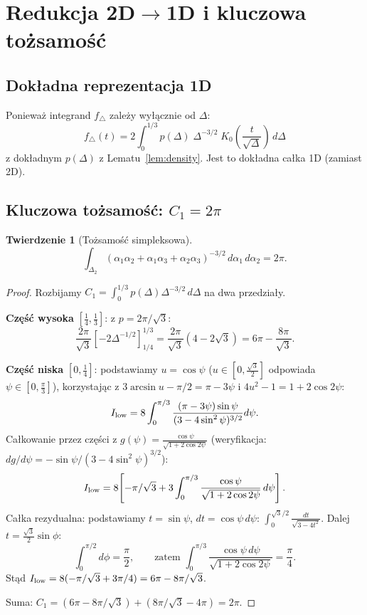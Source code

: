 \documentclass[11pt,a4paper]{article}
\newcommand{\Dt}{\Delta}
\newtheorem{theorem}{Twierdzenie}
\begin{document}
\section{Redukcja 2D$\to$1D i kluczowa to\.{z}samo\'s\'c}
\label{sec:1D}

\subsection{Dok\l{}adna reprezentacja 1D}

Poniewa\.{z} integrand $f_\triangle$ zale\.{z}y wy\l{}\k{a}cznie od $\Dt$:
\begin{equation}
\label{eq:f_triangle_1D}
\boxed{
f_\triangle(t)
= 2\int_0^{1/3} p(\Dt)\;\Dt^{-3/2}\;K_0\!\left(\frac{t}{\sqrt\Dt}\right)\,d\Dt
}
\end{equation}
z dok\l{}adnym $p(\Dt)$ z Lematu~\ref{lem:density}.
Jest to dok\l{}adna ca\l{}ka 1D (zamiast 2D).

\subsection{Kluczowa to\.{z}samo\'s\'c: $C_1 = 2\pi$}

\begin{theorem}[To\.{z}samo\'s\'c simpleksowa]
\label{thm:C1}
\begin{equation}
\label{eq:C1_identity}
\boxed{
\int_{\Delta_2}
(\alpha_1\alpha_2+\alpha_1\alpha_3+\alpha_2\alpha_3)^{-3/2}\,d\alpha_1\,d\alpha_2
= 2\pi.
}
\end{equation}
\end{theorem}

\begin{proof}
Rozbijamy $C_1 = \int_0^{1/3}p(\Dt)\Dt^{-3/2}\,d\Dt$ na dwa przedzia\l{}y.

\textbf{Cz\k{e}\'s\'c wysoka} $[\tfrac14,\tfrac13]$: z $p=2\pi/\sqrt3$:
\[
\frac{2\pi}{\sqrt3}\!\left[-2\Dt^{-1/2}\right]_{1/4}^{1/3}
= \frac{2\pi}{\sqrt3}(4-2\sqrt3) = 6\pi - \frac{8\pi}{\sqrt3}.
\]

\textbf{Cz\k{e}\'s\'c niska} $[0,\tfrac14]$: podstawiamy $u=\cos\psi$ ($u\in[0,\tfrac{\sqrt3}2]$ odpowiada $\psi\in[0,\tfrac\pi3]$), korzystaj\k{a}c z $3\arcsin u-\pi/2=\pi-3\psi$ i $4u^2-1=1+2\cos2\psi$:
\[
I_{\rm low} = 8\int_0^{\pi/3}\frac{(\pi-3\psi)\sin\psi}{(3-4\sin^2\psi)^{3/2}}d\psi.
\]
Ca\l{}kowanie przez cz\k{e}\'sci z
$g(\psi)=\frac{\cos\psi}{\sqrt{1+2\cos2\psi}}$
(weryfikacja: $dg/d\psi = -\sin\psi/(3-4\sin^2\psi)^{3/2}$):
\[
I_{\rm low}
= 8\!\left[-\pi/\sqrt3 + 3\int_0^{\pi/3}\frac{\cos\psi}{\sqrt{1+2\cos2\psi}}\,d\psi\right].
\]
Ca\l{}ka rezydualna: podstawiamy $t=\sin\psi$, $dt=\cos\psi\,d\psi$:
$\int_0^{\sqrt3/2}\frac{dt}{\sqrt{3-4t^2}}$.
Dalej $t=\tfrac{\sqrt3}{2}\sin\phi$:
\[
\int_0^{\pi/2}d\phi = \frac\pi2,\qquad
\text{zatem }\int_0^{\pi/3}\frac{\cos\psi\,d\psi}{\sqrt{1+2\cos2\psi}}=\frac\pi4.
\]
St\k{a}d $I_{\rm low}=8(-\pi/\sqrt3+3\pi/4)=6\pi-8\pi/\sqrt3$.

Suma: $C_1 = (6\pi-8\pi/\sqrt3)+(8\pi/\sqrt3-4\pi) = 2\pi$. \qedhere
\end{proof}
\end{document}
